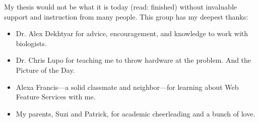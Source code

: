 \noindent
My thesis would not be what it is today (read: finished) without invaluable support and instruction from many people. This group has my deepest thanks:
\begin{itemize}
    \item Dr. Alex Dekhtyar for advice, encouragement, and knowledge to work with biologists.
    \item Dr. Chris Lupo for teaching me to throw hardware at the problem. And the Picture of the Day.
    \item Alexa Francis---a solid classmate and neighbor---for learning about Web Feature Services with me.
    \item My parents, Suzi and Patrick, for academic cheerleading and a bunch of love.
\end{itemize}
